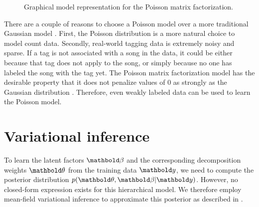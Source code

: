 \begin{figure}[ht]
  \centering
     
  \caption{Graphical model representation for the Poisson matrix factorization.}
\label{chpt:background:fig:pmf}
\end{figure}

There are a couple of reasons to choose a Poisson model over a more traditional Gaussian model \citep{salakhutdinov2007probabilistic}. First, the Poisson distribution is a more natural choice to model count data. Secondly, real-world tagging data is extremely noisy and sparse. If a tag is not associated with a song in the data, it could be either because that tag does not apply to the song, or simply because no one has labeled the song with the tag yet. The Poisson matrix factorization model has the desirable property that it does not penalize values of $0$ as strongly as the Gaussian distribution \citep{paisley2015handbook,Gopalan:2015}. Therefore, even weakly labeled data can be used to learn the Poisson model.  

\section{Variational inference}

To learn the latent factors $\mb{\beta}$ and the corresponding decomposition weights $\mb{\theta}$ from the training data $\mb{y}$, we need to compute the posterior distribution $p(\mb{\theta}, \mb{\beta} | \mb{y})$. However, no closed-form expression exists for this hierarchical model. We therefore employ mean-field variational inference to approximate this posterior as described in .

